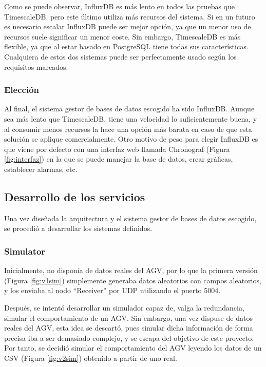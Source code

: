 Como se puede observar, InfluxDB es más lento en todos las pruebas que TimescaleDB, pero este último utiliza más 
recursos del sistema. Si en un futuro es necesario escalar InfluxDB puede ser mejor opción, ya que un menor uso de 
recursos suele significar un menor coste. Sin embargo, TimescaleDB es más flexible, ya que al estar basado en PostgreSQL 
tiene todas sus características. Cualquiera de estos dos sistemas puede ser perfectamente usado según los requisitos marcados.

\subsubsection*{Elección}

Al final, el sistema gestor de bases de datos escogido ha sido InfluxDB. Aunque sea más lento que TimescaleDB, tiene
una velocidad lo suficientemente buena, y al consumir menos recursos la hace una opción más barata en caso de que 
esta solución se aplique comercialmente. 
Otro motivo de peso para elegir InfluxDB es que viene por defecto con una interfaz web llamada Chronograf 
(Figura \ref*{fig:interfaz}) en la que se puede manejar la base de datos, crear gráficas, establecer alarmas, etc.


\subsection*{Desarrollo de los servicios}

Una vez diseñada la arquitectura y el sistema gestor de bases de datos escogido, se procedió a desarrollar los
sistemas definidos.

\subsubsection*{Simulator}
Inicialmente, no disponía de datos reales del AGV, por lo que la primera versión (Figura \ref*{fig:v1sim}) simplemente generaba datos aleatorios
con campos aleatorios, y los enviaba al nodo ``Receiver'' por UDP utilizando el puerto 5004.

Después, se intentó desarrollar un simulador capaz de, valga la redundancia, simular el comportamiento de un AGV. Sin
embargo, una vez dispuse de datos reales del AGV, esta idea se descartó, pues simular dicha información de forma
precisa iba a ser demasiado complejo, y se escapa del objetivo de este proyecto. Por tanto, se decidió simular el
comportamiento del AGV leyendo los datos de un CSV (Figura \ref*{fig:v2sim}) obtenido a partir de uno real.

